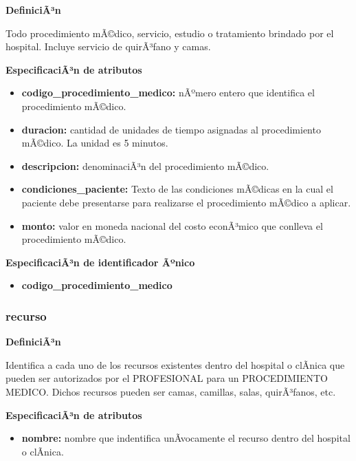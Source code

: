\documentclass[a4paper,11pt]{article}
\begin{document}
\textbf{DefiniciÃ³n}

Todo procedimiento mÃ©dico, servicio, estudio o tratamiento brindado por el hospital. 
Incluye servicio de quirÃ³fano y camas.

\textbf{EspecificaciÃ³n de atributos}

\begin{itemize}

     \item \textbf{codigo\_procedimiento\_medico:} nÃºmero entero que identifica el procedimiento mÃ©dico.

     \item \textbf{duracion:} cantidad de unidades de tiempo asignadas al procedimiento mÃ©dico. La 
     unidad es 5 minutos.

     \item \textbf{descripcion:} denominaciÃ³n del procedimiento mÃ©dico.

     \item \textbf{condiciones\_paciente:} Texto de las condiciones mÃ©dicas en la cual el paciente 
     debe presentarse para realizarse el procedimiento mÃ©dico a aplicar.

     \item \textbf{monto:} valor en moneda nacional del costo econÃ³mico que conlleva el procedimiento mÃ©dico.

\end{itemize}

\textbf{EspecificaciÃ³n de identificador Ãºnico}

\begin{itemize}

     \item \textbf{codigo\_procedimiento\_medico}

\end{itemize}

\subsubsection{\textbf{recurso}}

\textbf{DefiniciÃ³n}

Identifica a cada uno de los recursos existentes dentro del hospital o clÃ­nica
que pueden ser autorizados por el PROFESIONAL para un PROCEDIMIENTO MEDICO.
Dichos recursos pueden ser camas, camillas, salas, quirÃ³fanos, etc.

\textbf{EspecificaciÃ³n de atributos}

\begin{itemize}

     \item \textbf{nombre:} nombre que indentifica unÃ­vocamente el recurso dentro del hospital o clÃ­nica.

\end{itemize}
\end{document}
